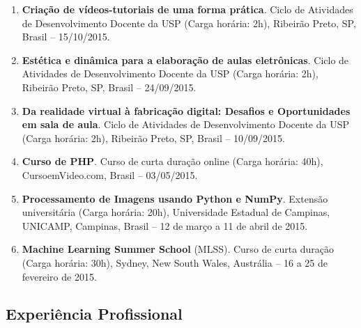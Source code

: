 \documentclass[
  brazilian,
  11pt,
  a4paper,
]{article}
\begin{document}
\begin{enumerate}
  \textbf{DAT203x Data Science \& Machine Learning Essential}. Curso de
  curta duração online (Carga horária: 20h), Microsoft Corporation,
  Washington, D. C., Estados Unidos -- 01/11/2015.
\item
  \textbf{Criação de vídeos-tutoriais de uma forma prática}. Ciclo de
  Atividades de Desenvolvimento Docente da USP (Carga horária: 2h),
  Ribeirão Preto, SP, Brasil -- 15/10/2015.
\item
  \textbf{Estética e dinâmica para a elaboração de aulas eletrônicas}.
  Ciclo de Atividades de Desenvolvimento Docente da USP (Carga horária:
  2h), Ribeirão Preto, SP, Brasil -- 24/09/2015.
\item
  \textbf{Da realidade virtual à fabricação digital: Desafios e
  Oportunidades em sala de aula}. Ciclo de Atividades de Desenvolvimento
  Docente da USP (Carga horária: 2h), Ribeirão Preto, SP, Brasil --
  10/09/2015.
\item
  \textbf{Curso de PHP}. Curso de curta duração online (Carga horária:
  40h), CursoemVideo.com, Brasil -- 03/05/2015.
\item
  \textbf{Processamento de Imagens usando Python e NumPy}. Extensão
  universitária (Carga horária: 20h), Universidade Estadual de Campinas,
  UNICAMP, Campinas, Brasil -- 12 de março a 11 de abril de 2015.
\item
  \textbf{Machine Learning Summer School} (MLSS). Curso de curta duração
  (Carga horária: 30h), Sydney, New South Wales, Austrália -- 16 a 25 de
  fevereiro de 2015.
\end{enumerate}

\subsection{Experiência Profissional}\label{experiuxeancia-profissional}
\end{document}
